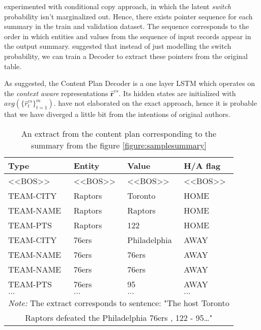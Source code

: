 \citet{wiseman2017} experimented with conditional copy approach, in which the latent \emph{switch} probability isn't marginalized out. Hence, there exists pointer sequence for each summary in the train and validation dataset. The sequence corresponds to the order in which entities and values from the sequence of input records appear in the output summary. \citet{puduppully2019datatotext} suggested that instead of just modelling the switch probability, we can train a Decoder to extract these pointers from the original table.

As suggested, the Content Plan Decoder is a one layer LSTM which operates on the \emph{context aware} representations $\hat{\boldsymbol{r}}^{cs}$. Its hidden states are initialized with $avg(\{\hat{r}_t^{cs}\}_{t=1}^m)$. \citet{puduppully2019datatotext} have not elaborated on the exact approach, hence it is probable that we have diverged a little bit from the intentions of original authors.

\begin{table}[h]
    \centering \small
    \begin{tabular}{llll}
        \toprule
        \textbf{Type} & \textbf{Entity} & \textbf{Value} & \textbf{H/A flag} \\                  
        \midrule
        \textless{}\textless{}BOS\textgreater{}\textgreater{} & \textless{}\textless{}BOS\textgreater{}\textgreater{} & \textless{}\textless{}BOS\textgreater{}\textgreater{} & \textless{}\textless{}BOS\textgreater{}\textgreater{} \\
        TEAM-CITY    & Raptors      & Toronto      & HOME                                                  \\
        TEAM-NAME    & Raptors      & Raptors      & HOME                                                  \\
        TEAM-PTS     & Raptors      & 122          & HOME                                                  \\
        TEAM-CITY    & 76ers        & Philadelphia & AWAY                                                  \\
        TEAM-NAME    & 76ers        & 76ers        & AWAY                                                  \\
        TEAM-NAME    & 76ers        & 76ers        & AWAY                                                  \\
        TEAM-PTS     & 76ers        & 95           & AWAY                                                  \\
        $\dots$      & $\dots$      & $\dots$      & $\dots$ \\                                        
        \bottomrule
        \multicolumn{4}{c}{\footnotesize \textit{Note:} The extract corresponds to sentence: "The host Toronto} \\
        \multicolumn{4}{c}{\footnotesize Raptors defeated the Philadelphia 76ers , 122 - 95\dots "}
    \end{tabular}
    \caption{An extract from the content plan corresponding to the summary from the figure \ref{figure:samplesummary}}
\end{table}

